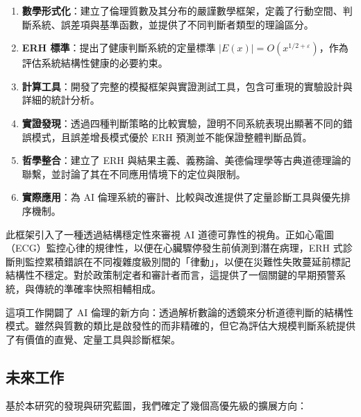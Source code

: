 \documentclass[12pt,a4paper]{article}
\theoremstyle{definition}
\theoremstyle{remark}
\begin{document}
\begin{enumerate}
    \item \textbf{數學形式化}：建立了倫理質數及其分布的嚴謹數學框架，定義了行動空間、判斷系統、誤差項與基準函數，並提供了不同判斷者類型的理論區分。
    \item \textbf{ERH 標準}：提出了健康判斷系統的定量標準 $|E(x)| = O(x^{1/2+\varepsilon})$，作為評估系統結構性健康的必要約束。
    \item \textbf{計算工具}：開發了完整的模擬框架與實證測試工具，包含可重現的實驗設計與詳細的統計分析。
    \item \textbf{實證發現}：透過四種判斷策略的比較實驗，證明不同系統表現出顯著不同的錯誤模式，且誤差增長模式優於 ERH 預測並不能保證整體判斷品質。
    \item \textbf{哲學整合}：建立了 ERH 與結果主義、義務論、美德倫理學等古典道德理論的聯繫，並討論了其在不同應用情境下的定位與限制。
    \item \textbf{實際應用}：為 AI 倫理系統的審計、比較與改進提供了定量診斷工具與優先排序機制。
\end{enumerate}

此框架引入了一種透過結構穩定性來審視 AI 道德可靠性的視角。正如心電圖（ECG）監控心律的規律性，以便在心臟驟停發生前偵測到潛在病理，ERH 式診斷則監控累積錯誤在不同複雜度級別間的「律動」，以便在災難性失敗蔓延前標記結構性不穩定。對於政策制定者和審計者而言，這提供了一個關鍵的早期預警系統，與傳統的準確率快照相輔相成。

這項工作開闢了 AI 倫理的新方向：透過解析數論的透鏡來分析道德判斷的結構性模式。雖然與質數的類比是啟發性的而非精確的，但它為評估大規模判斷系統提供了有價值的直覺、定量工具與診斷框架。

\subsection{未來工作}

基於本研究的發現與研究藍圖，我們確定了幾個高優先級的擴展方向：
\end{document}

